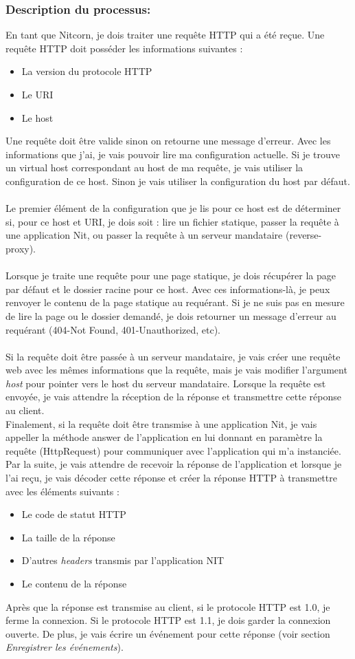 \documentclass{scrreprt}
\begin{document}
\subsubsection{Description du processus:}En tant que Nitcorn, je dois traiter une requête HTTP qui a été reçue. Une requête HTTP doit posséder les informations suivantes :
\begin{itemize}
    \item La version du protocole HTTP
    \item Le URI
    \item Le host
\end{itemize}
Une requête doit être valide sinon on retourne une message d'erreur. Avec les informations que j'ai, je vais pouvoir lire ma configuration actuelle. Si
je trouve un virtual host correspondant au host de ma requête, je vais utiliser la configuration de ce host. Sinon je vais utiliser la configuration du host par défaut. \\
\\
Le premier élément de la configuration que je lis pour ce host est de déterminer
si, pour ce host et URI, je dois soit : lire un fichier statique, passer la requête
à une application Nit, ou passer la requête à un serveur mandataire (reverse-proxy).\\
\\
Lorsque je traite une requête pour une page statique, je dois récupérer la page par
défaut et le dossier racine pour ce host. Avec ces informations-là, je peux renvoyer
le contenu de la page statique au requérant. Si je ne suis pas en mesure de lire
la page ou le dossier demandé, je dois retourner un message d'erreur au requérant
(404-Not Found, 401-Unauthorized, etc).\\
\\
Si la requête doit être passée à un serveur mandataire, je vais créer
une requête web avec les mêmes informations que la requête, mais je vais modifier
l'argument \textit{host} pour pointer vers le host du serveur mandataire. Lorsque
la requête est envoyée, je vais attendre la réception de la réponse et transmettre
cette réponse au client.
\\
Finalement, si la requête doit être transmise à une application Nit, je vais
appeller la méthode answer de l'application en lui donnant en paramètre la requête (HttpRequest) pour communiquer avec l'application qui m'a instanciée. Par la suite, je vais attendre de recevoir la réponse de l'application
et lorsque je l'ai reçu, je vais décoder cette réponse et créer la réponse HTTP
à transmettre avec les éléments suivants :
\begin{itemize}
    \item Le code de statut HTTP
    \item La taille de la réponse
    \item D'autres \textit{headers} transmis par l'application NIT
    \item Le contenu de la réponse
\end{itemize}
Après que la réponse est transmise au client, si le protocole HTTP est 1.0, je ferme
la connexion. Si le protocole HTTP est 1.1, je dois garder la connexion
ouverte. De plus, je vais écrire un événement pour cette réponse (voir section
\textit{Enregistrer les événements}).
\end{document}
